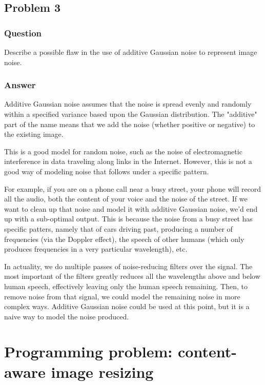 \documentclass[12pt]{article}
\begin{document}
\newpage
\subsection*{Problem 3}
\subsubsection*{Question}
Describe a possible flaw in the use of additive Gaussian noise to represent image noise.

\subsubsection*{Answer}
Additive Gaussian noise assumes that the noise is spread evenly and randomly within a specified variance based upon the Gaussian distribution. The "additive" part of the name means that we add the noise (whether positive or negative) to the existing image.

\noindent
This is a good model for random noise, such as the noise of electromagnetic interference in data traveling along links in the Internet. However, this is not a good way of modeling noise that follows under a specific pattern.

\noindent
For example, if you are on a phone call near a busy street, your phone will record all the audio, both the content of your voice and the noise of the street. If we want to clean up that noise and model it with additive Gaussian noise, we'd end up with a sub-optimal output. This is because the noise from a busy street has specific patters, namely that of cars driving past, producing a number of frequencies (via the Doppler effect), the speech of other humans (which only produces frequencies in a very particular wavelength), etc.

\noindent
In actuality, we do multiple passes of noise-reducing filters over the signal. The most important of the filters greatly reduces all the wavelengths above and below human speech, effectively leaving only the human speech remaining. Then, to remove noise from that signal, we could model the remaining noise in more complex ways. Additive Gaussian noise could be used at this point, but it is a naive way to model the noise produced.

\newpage
\section*{Programming problem: content-aware image resizing}
\end{document}
